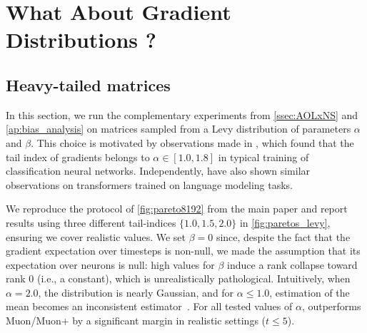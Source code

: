 \section{What About Gradient Distributions ?}
    \label{ap:real_gradients}
    
    \subsection{Heavy-tailed matrices}
    In this section, we run the complementary experiments from \cref{ssec:AOLxNS} and \cref{ap:bias_analysis} on matrices sampled from a Levy distribution of parameters $\alpha$ and $\beta$. This choice is motivated by observations made in \cite{Simsekli2019TailIndex}, which found that the tail index of gradients belongs to $\alpha \in [1.0, 1.8]$ in typical training of classification neural networks. Independently, \cite{kunstner2024heavy} have also shown similar observations on transformers trained on language modeling tasks.

    \hfill
      
    We reproduce the protocol of \cref{fig:pareto8192} from the main paper and report results using three different tail-indices $\{ 1.0, 1.5, 2.0 \}$ in \cref{fig:paretos_levy}, ensuring we cover realistic values. We set $\beta=0$ since, despite the fact that the gradient expectation over timesteps is non-null, we made the assumption that its expectation over neurons is null: high values for $\beta$ induce a rank collapse toward rank 0 (i.e., a constant), which is unrealistically pathological. Intuitively, when $\alpha=2.0$, the distribution is nearly Gaussian, and for $\alpha\leq 1.0$, estimation of the mean becomes an inconsistent estimator~\cite{wiki_Levy_distribution}. For all tested values of $\alpha$, \turbomuon outperforms Muon/Muon+ by a significant margin in realistic settings ($t \leq 5$).
    

